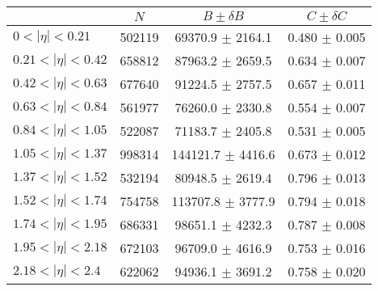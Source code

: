 \begin{tabular}{lccc}
\hline
    &   $N$   & $B \pm \delta B$  &  $C \pm \delta C$ \\
\hline
$0 < |\eta| <0.21$             & 502119     & 69370.9    $\pm$ 2164.1 & 0.480      $\pm$ 0.005 \\
$0.21 < |\eta| <0.42$          & 658812     & 87963.2    $\pm$ 2659.5 & 0.634      $\pm$ 0.007 \\
$0.42 < |\eta| <0.63$          & 677640     & 91224.5    $\pm$ 2757.5 & 0.657      $\pm$ 0.011 \\
$0.63 < |\eta| <0.84$          & 561977     & 76260.0    $\pm$ 2330.8 & 0.554      $\pm$ 0.007 \\
$0.84 < |\eta| <1.05$          & 522087     & 71183.7    $\pm$ 2405.8 & 0.531      $\pm$ 0.005 \\
$1.05 < |\eta| <1.37$          & 998314     & 144121.7   $\pm$ 4416.6 & 0.673      $\pm$ 0.012 \\
$1.37 < |\eta| <1.52$          & 532194     & 80948.5    $\pm$ 2619.4 & 0.796      $\pm$ 0.013 \\
$1.52 < |\eta| <1.74$          & 754758     & 113707.8   $\pm$ 3777.9 & 0.794      $\pm$ 0.018 \\
$1.74 < |\eta| <1.95$          & 686331     & 98651.1    $\pm$ 4232.3 & 0.787      $\pm$ 0.008 \\
$1.95 < |\eta| <2.18$          & 672103     & 96709.0    $\pm$ 4616.9 & 0.753      $\pm$ 0.016 \\
$2.18 < |\eta| <2.4$           & 622062     & 94936.1    $\pm$ 3691.2 & 0.758      $\pm$ 0.020 \\
\hline
\end{tabular}
